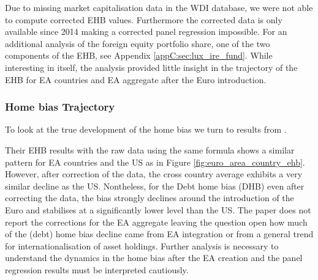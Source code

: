\documentclass[11pt,a4paper]{article}
\begin{document}
Due to missing market capitalisation data in the WDI database, we were not able to compute corrected EHB values. Furthermore the corrected data is only available since 2014 making a corrected panel regression impossible.
For an additional analysis of the foreign equity portfolio share, one of the two components of the EHB, see Appendix \ref{appC:sec:lux_ire_fund}. While interesting in itself, the analysis provided little insight in the trajectory of the EHB for EA countries and EA aggregate after the Euro introduction.


\subsubsection{Home bias Trajectory}

To look at the true development of the home bias we turn to results from \textcite{NBERw32275}.

Their EHB results with the raw data using the same formula shows a similar pattern for EA countries and the US as in Figure \ref{fig:euro_area_country_ehb}. However, after correction of the data, the cross country average exhibits a very similar decline as the US. 
Nontheless, for the Debt home bias (DHB) even after correcting the data, the bias strongly declines around the introduction of the Euro and stabilises at a significantly lower level than the US. The paper does not report the corrections for the EA aggregate leaving the question open how much of the (debt) home bias decline came from EA integration or from a general trend for internationalisation of asset holdings.
Further analysis is necessary to understand the dynamics in the home bias after the EA creation and the panel regression results must be interpreted cautiously.
\end{document}
